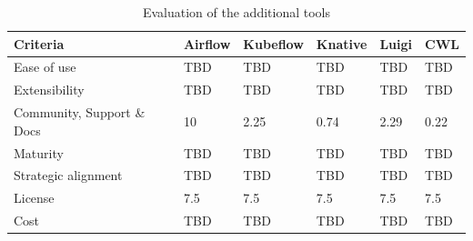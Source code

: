 \begin{table}[htb]
    \centering
    \begin{tabular}{|l|l|l|l|l|l|} \hline
        \textbf{Criteria}                                          & \textbf{Airflow}      & \textbf{Kubeflow}     & \textbf{Knative}      & \textbf{Luigi}        & \textbf{CWL}          \\ \hline
        Ease of use                                                & TBD                   & TBD                   & TBD                   & TBD                   & TBD                   \\ \hline
        Extensibility                                              & TBD                   & TBD                   & TBD                   & TBD                   & TBD                   \\ \hline
        Community, Support \& Docs                                 & 10                    & 2.25                  & 0.74                  & 2.29                  & 0.22                  \\ \hline
        Maturity                                                   & TBD                   & TBD                   & TBD                   & TBD                   & TBD                   \\ \hline
        Strategic alignment                                        & TBD                   & TBD                   & TBD                   & TBD                   & TBD                   \\ \hline
        License                                                    & 7.5                     & 7.5                     & 7.5                     & 7.5                     & 7.5                     \\ \hline
        Cost                                                       & TBD                   & TBD                   & TBD                   & TBD                   & TBD                   \\ \hline

    \end{tabular}
    \caption{Evaluation of the additional tools}
    \label{tab:evaluation_of_the_additional_tools}
\end{table}


\newpage
{}


